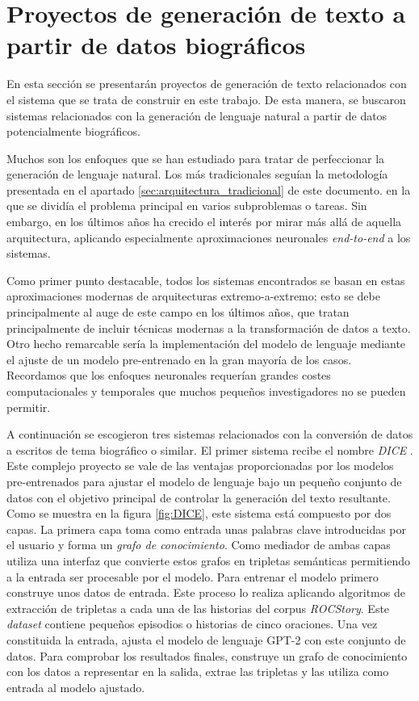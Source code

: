 \section{Proyectos de generación de texto a partir de datos biográficos}
\label{sec:proyectos}
En esta sección se presentarán proyectos de generación de texto relacionados con el sistema que se trata de construir en este trabajo. De esta manera, se buscaron sistemas relacionados con la generación de lenguaje natural a partir de datos potencialmente biográficos. 

Muchos son los enfoques que se han estudiado para tratar de perfeccionar la generación de lenguaje natural. Los más tradicionales seguían la metodología presentada en el apartado \ref{sec:arquitectura_tradicional} de este documento. en la que se dividía el problema principal en varios subproblemas o tareas. Sin embargo, en los últimos años ha crecido el interés por mirar más allá de aquella arquitectura, aplicando especialmente aproximaciones neuronales \textit{end-to-end} a los sistemas. 

Como primer punto destacable, todos los sistemas encontrados se basan en estas aproximaciones modernas de arquitecturas extremo-a-extremo; esto se debe principalmente al auge de este campo en los últimos años, que tratan principalmente de incluir técnicas modernas a la transformación de datos a texto. Otro hecho remarcable sería la implementación del modelo de lenguaje mediante el ajuste de un modelo pre-entrenado en la gran mayoría de los casos. Recordamos que los enfoques neuronales requerían grandes costes computacionales y temporales que muchos pequeños investigadores no se pueden permitir.
 
A continuación se escogieron tres sistemas relacionados con la conversión de datos a escritos de tema biográfico o similar.
El primer sistema recibe el nombre \textit{DICE} \citep{yang2020creative}. Este complejo proyecto se vale de las ventajas proporcionadas por los modelos pre-entrenados para ajustar el modelo de lenguaje bajo un pequeño conjunto de datos con el objetivo principal de controlar la generación del texto resultante. Como se muestra en la figura \ref{fig:DICE}, este sistema está compuesto por dos capas. La primera capa toma como entrada unas palabras clave introducidas por el usuario y forma un \textit{grafo de conocimiento}. Como mediador de ambas capas utiliza una interfaz que convierte estos grafos en tripletas semánticas permitiendo a la entrada ser procesable por el modelo. Para entrenar el modelo primero construye unos datos de entrada. Este proceso lo realiza aplicando algoritmos de extracción de tripletas a cada una de las historias del corpus \textit{ROCStory}. Este \textit{dataset} contiene pequeños episodios o historias de cinco oraciones. Una vez constituida la entrada, ajusta el modelo de lenguaje GPT-2 con este conjunto de datos. Para comprobar los resultados finales, construye un grafo de conocimiento con los datos a representar en la salida, extrae las tripletas y las utiliza como entrada al modelo ajustado.

